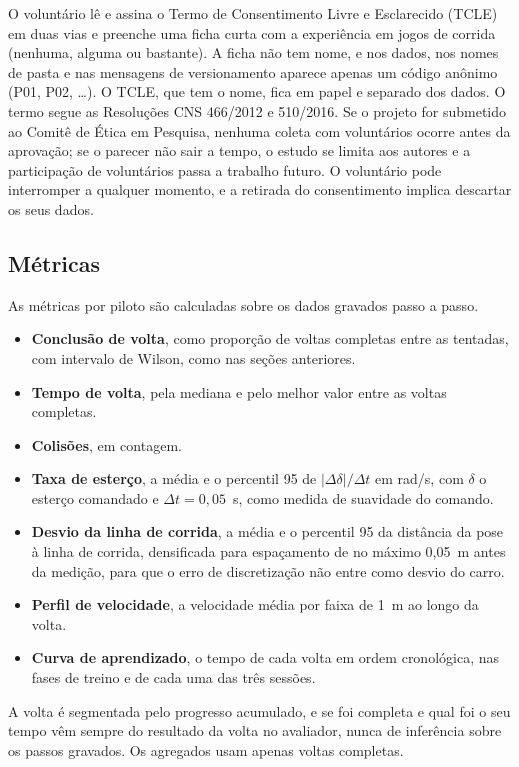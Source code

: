 O voluntário lê e assina o Termo de Consentimento Livre e Esclarecido (TCLE) em
duas vias e preenche uma ficha curta com a experiência em jogos de corrida
(nenhuma, alguma ou bastante). A ficha não tem nome, e nos dados, nos nomes de
pasta e nas mensagens de versionamento aparece apenas um código anônimo (P01,
P02, \dots). O TCLE, que tem o nome, fica em papel e separado dos dados. O termo
segue as Resoluções CNS 466/2012 e 510/2016. Se o projeto for submetido ao Comitê
de Ética em Pesquisa, nenhuma coleta com voluntários ocorre antes da aprovação;
se o parecer não sair a tempo, o estudo se limita aos autores e a participação de
voluntários passa a trabalho futuro. O voluntário pode interromper a qualquer
momento, e a retirada do consentimento implica descartar os seus dados.

\subsection{Métricas}

As métricas por piloto são calculadas sobre os dados gravados passo a passo.
\begin{itemize}
    \item \textbf{Conclusão de volta}, como proporção de voltas completas entre as
          tentadas, com intervalo de Wilson, como nas seções anteriores.
    \item \textbf{Tempo de volta}, pela mediana e pelo melhor valor entre as voltas
          completas.
    \item \textbf{Colisões}, em contagem.
    \item \textbf{Taxa de esterço}, a média e o percentil 95 de
          $|\Delta\delta|/\Delta t$ em rad/s, com $\delta$ o esterço comandado e
          $\Delta t = 0{,}05$~s, como medida de suavidade do comando.
    \item \textbf{Desvio da linha de corrida}, a média e o percentil 95 da
          distância da pose à linha de corrida, densificada para espaçamento de
          no máximo 0,05~m antes da medição, para que o erro de discretização
          não entre como desvio do carro.
    \item \textbf{Perfil de velocidade}, a velocidade média por faixa de 1~m ao
          longo da volta.
    \item \textbf{Curva de aprendizado}, o tempo de cada volta em ordem cronológica,
          nas fases de treino e de cada uma das três sessões.
\end{itemize}
A volta é segmentada pelo progresso acumulado, e se foi completa e qual foi o seu
tempo vêm sempre do resultado da volta no avaliador, nunca de inferência sobre os
passos gravados. Os agregados usam apenas voltas completas.

